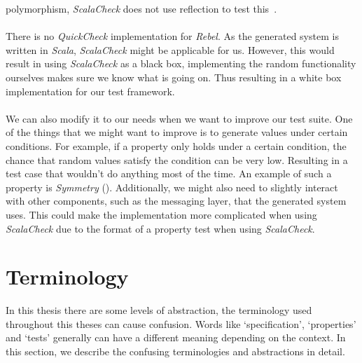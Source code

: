 polymorphism, \textit{ScalaCheck} does not use reflection to test
this~\cite{kang2011fortresscheck}.\\
\\
There is no \textit{QuickCheck} implementation for \textit{Rebel}. As the
generated system is written in \textit{Scala}, \textit{ScalaCheck} might be
applicable for us. However, this would result in using \textit{ScalaCheck} as a
black box, implementing the random functionality ourselves makes sure we know
what is going on. Thus resulting in a white box implementation for our test
framework.\\
\\
We can also modify it to our needs when we want to improve our test suite. One
of the things that we might want to improve is to generate values under certain
conditions. For example, if a property only holds under a certain condition, the
chance that random values satisfy the condition can be very low. Resulting in a
test case that wouldn't do anything most of the time. An example of such a
property is \textit{Symmetry} ().%
Additionally, we might also need to slightly interact with other components,
such as the messaging layer, that the generated system uses. This could make the
implementation more complicated when using \textit{ScalaCheck} due to the format
of a property test when using \textit{ScalaCheck}.

\section{Terminology}
In this thesis there are some levels of abstraction, the terminology used
throughout this theses can cause confusion. Words like `specification',
`properties' and `tests' generally can have a different meaning depending on the
context. In this section, we describe the confusing terminologies and
abstractions in detail.

